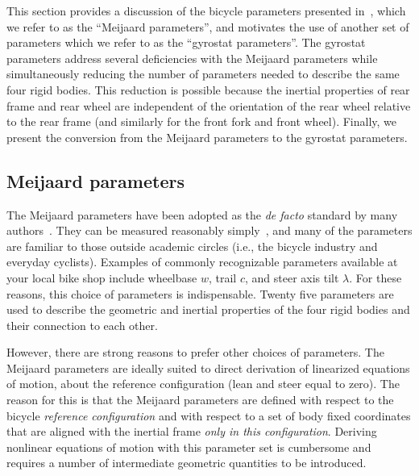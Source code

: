This section provides a discussion of the bicycle parameters presented
in~\cite{Meijaard2007}, which we refer to as the ``Meijaard parameters'', and
motivates the use of another set of parameters which we refer to as the
``gyrostat parameters''. The gyrostat parameters address several deficiencies
with the Meijaard parameters while simultaneously reducing the number of
parameters needed to describe the same four rigid bodies. This reduction is
possible because the inertial properties of rear frame and rear wheel are
independent of the orientation of the rear wheel relative to the rear frame
(and similarly for the front fork and front wheel). Finally, we present the
conversion from the Meijaard parameters to the gyrostat parameters.

\subsection{Meijaard parameters} \label{model:meijaard_parameters}
The Meijaard parameters have been adopted as the \textit{de facto} standard by
many authors~\cite{Sharp2008}. They can be measured reasonably
simply~\cite{Moore2010b}, and many of the parameters are familiar to those
outside academic circles (i.e., the bicycle industry and everyday cyclists).
Examples of commonly recognizable parameters available at your local bike shop
include wheelbase $w$, trail $c$, and steer axis tilt $\lambda$. For these
reasons, this choice of parameters is indispensable. Twenty five parameters are
used to describe the geometric and inertial properties of the four rigid bodies
and their connection to each other.

However, there are strong reasons to prefer other choices of parameters. The
Meijaard parameters are ideally suited to direct derivation of linearized
equations of motion, about the reference configuration (lean and steer equal to
zero). The reason for this is that the Meijaard parameters are defined with
respect to the bicycle \textit{reference configuration} and with respect to a
set of body fixed coordinates that are aligned with the inertial frame
\textit{only in this configuration}. Deriving nonlinear equations of motion
with this parameter set is cumbersome and requires a number of intermediate
geometric quantities to be introduced.

